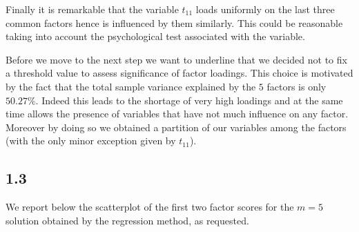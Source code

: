 \documentclass[
]{article}
\newenvironment{Shaded}{\begin{snugshade}}{\end{snugshade}}
\newcommand{\AttributeTok}[1]{\textcolor[rgb]{0.13,0.29,0.53}{#1}}
\newcommand{\DecValTok}[1]{\textcolor[rgb]{0.00,0.00,0.81}{#1}}
\newcommand{\FunctionTok}[1]{\textcolor[rgb]{0.13,0.29,0.53}{\textbf{#1}}}
\newcommand{\NormalTok}[1]{#1}
\newcommand{\OtherTok}[1]{\textcolor[rgb]{0.56,0.35,0.01}{#1}}
\newcommand{\SpecialCharTok}[1]{\textcolor[rgb]{0.81,0.36,0.00}{\textbf{#1}}}
\newcommand{\StringTok}[1]{\textcolor[rgb]{0.31,0.60,0.02}{#1}}
\theoremstyle{plain}
\begin{document}
Finally it is remarkable that the variable \(t_{11}\) loads uniformly on
the last three common factors hence is influenced by them similarly.
This could be reasonable taking into account the psychological test
associated with the variable.

Before we move to the next step we want to underline that we decided not
to fix a threshold value to assess significance of factor loadings. This
choice is motivated by the fact that the total sample variance explained
by the \(5\) factors is only \(50.27\%\). Indeed this leads to the
shortage of very high loadings and at the same time allows the presence
of variables that have not much influence on any factor. Moreover by
doing so we obtained a partition of our variables among the factors
(with the only minor exception given by \(t_{11}\)).

\hypertarget{section-2}{%
\subsection{1.3}\label{section-2}}

We report below the scatterplot of the first two factor scores for the
\(m = 5\) solution obtained by the regression method, as requested.

\smallskip

\begin{Shaded}
\end{Shaded}

\vspace{-40pt}
\end{document}
